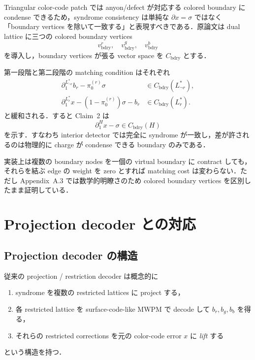 \documentclass[a4paper,11pt]{ltjsarticle}
\newcommand{\bd}{\partial}
\begin{document}
Triangular color-code patch では anyon/defect が対応する colored boundary に condense できるため，syndrome consistency は単純な $\bd x=\sigma$ ではなく「boundary vertices を除いて一致する」と表現すべきである．原論文は dual lattice に三つの colored boundary vertices
\begin{equation}
 v^r_{\mathrm{bdry}},\quad v^g_{\mathrm{bdry}},\quad v^b_{\mathrm{bdry}}
\end{equation}
を導入し，boundary vertices が張る vector space を $C_{\mathrm{bdry}}$ とする．

第一段階と第二段階の matching condition はそれぞれ
\begin{align}
 \bd_1^{L^*_{\neg r}}b_r-\pi_0^{(r)}\sigma
 &\in C_{\mathrm{bdry}}(L^*_{\neg r}),
 \label{eq:boundary-first}\\
 \bd_1^{L^*_r}x-(1-\pi_0^{(r)})\sigma-b_r
 &\in C_{\mathrm{bdry}}(L^*_r).
 \label{eq:boundary-second}
\end{align}
と緩和される．すると Claim~2 は
\begin{equation}
 \bd_1^H x-\sigma\in C_{\mathrm{bdry}}(H)
 \label{eq:boundary-result}
\end{equation}
を示す．すなわち interior detector では完全に syndrome が一致し，差が許されるのは物理的に charge が condense できる boundary のみである．

実装上は複数の boundary nodes を一個の virtual boundary に contract しても，それらを結ぶ edge の weight を zero とすれば matching cost は変わらない．ただし Appendix~A.3 では数学的明瞭さのため colored boundary vertices を区別したまま証明している．

\section{Projection decoder との対応}
\subsection{Projection decoder の構造}

従来の projection / restriction decoder は概念的に
\begin{enumerate}
  \item syndrome を複数の restricted lattices に project する，
  \item 各 restricted lattice を surface-code-like MWPM で decode して $b_r,b_g,b_b$ を得る，
  \item それらの restricted corrections を元の color-code error $x$ に \emph{lift} する
\end{enumerate}
という構造を持つ．
\end{document}
